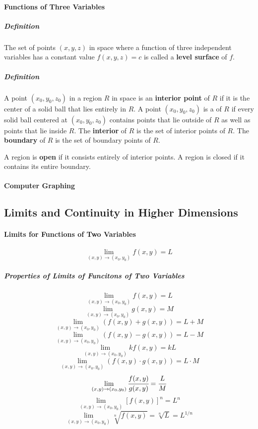 \documentclass{article}
\begin{document}
            \paragraph{Functions of Three Variables}
                \subparagraph{Definition} The set of points $(x,y,z)$ in space where a function of three independent variables has a constant value $f(x,y,z)=c$ is called a \textbf{level surface} of $f$.
                \subparagraph{Definition} A point $(x_0,y_0,z_0)$ in a region $R$ in space is an \textbf{interior point} of $R$ if it is the center of a solid ball that lies entirely in $R$. A point $(x_0,y_0,z_0)$ is a  of $R$ if every solid ball centered at $(x_0,y_0,z_0)$ contains points that lie outside of $R$ as well as points that lie inside $R$. The \textbf{interior} of $R$ is the set of interior points of $R$. The \textbf{boundary} of $R$ is the set of boundary points of $R$.
                \par A region is \textbf{open} if it consists entirely of interior points. A region is closed if it contains its entire boundary.
            \paragraph{Computer Graphing}
        \subsection{Limits and Continuity in Higher Dimensions}
            \paragraph{Limits for Functions of Two Variables}
                \[\lim\limits_{(x,y)\to(x_0,y_0)}f(x,y)=L\]
                \subparagraph{Properties of Limits of Funcitons of Two Variables}
                    \[\lim\limits_{(x,y)\to(x_0,y_0)}f(x,y)=L\]
                    \[\lim\limits_{(x,y)\to(x_0,y_0)}g(x,y)=M\]
                    \[\lim\limits_{(x,y)\to(x_0,y_0)}(f(x,y)+g(x,y))=L+M\]
                    \[\lim\limits_{(x,y)\to(x_0,y_0)}(f(x,y)-g(x,y))=L-M\]
                    \[\lim\limits_{(x,y)\to(x_0,y_0)}kf(x,y)=kL\]
                    \[\lim\limits_{(x,y)\to(x_0,y_0)}(f(x,y)\cdot g(x,y))=L\cdot M\]
                    \[\lim\limits_{(x,y)\to(x_0,y_0)}\cfrac{f(x,y)}{g(x,y)}=\cfrac{L}{M}\]
                    \[\lim\limits_{(x,y)\to(x_0,y_0)}[f(x,y)]^n=L^n\]
                    \[\lim\limits_{(x,y)\to(x_0,y_0)}\sqrt[n]{f(x,y)}=\sqrt[n]{L}=L^{1/n}\]
\end{document}
